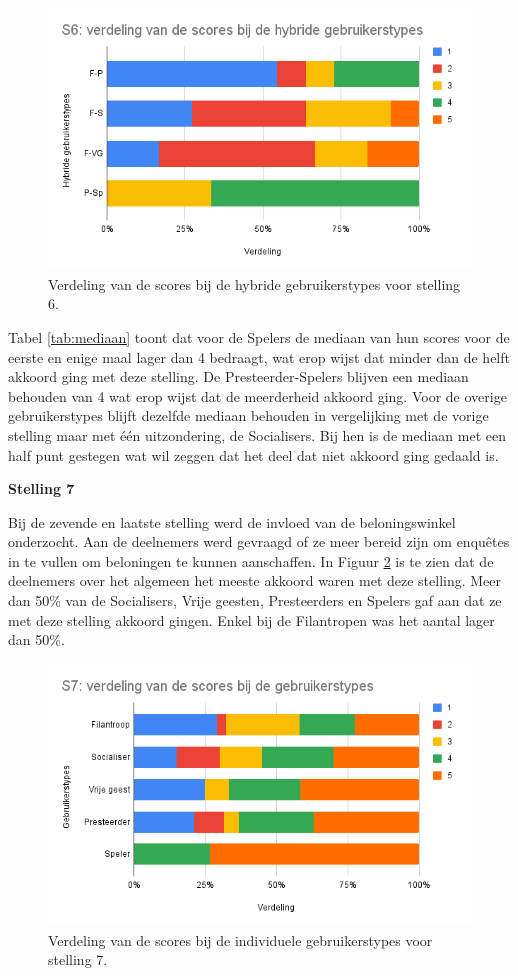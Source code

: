 \begin{figure}
    \includegraphics[width=\linewidth]{S6_Hybride.png}
    \caption{Verdeling van de scores bij de hybride gebruikerstypes voor stelling 6.}
    \label{fig:s6_hybride}
\end{figure}

Tabel \ref{tab:mediaan} toont dat voor de Spelers de mediaan van hun scores voor de eerste en enige maal lager dan 4 bedraagt, wat erop wijst dat minder dan de helft akkoord ging met deze stelling. De Presteerder-Spelers blijven een mediaan behouden van 4 wat erop wijst dat de meerderheid akkoord ging. Voor de overige gebruikerstypes blijft dezelfde mediaan behouden in vergelijking met de vorige stelling maar met één uitzondering, de Socialisers. Bij hen is de mediaan met een half punt gestegen wat wil zeggen dat het deel dat niet akkoord ging gedaald is.

\textbf{Stelling 7}

Bij de zevende en laatste stelling werd de invloed van de beloningswinkel onderzocht. Aan de deelnemers werd gevraagd of ze meer bereid zijn om enquêtes in te vullen om beloningen te kunnen aanschaffen. In Figuur \ref{fig:s7} is te zien dat de deelnemers over het algemeen het meeste akkoord waren met deze stelling. Meer dan 50\% van de Socialisers, Vrije geesten, Presteerders en Spelers gaf aan dat ze met deze stelling akkoord gingen. Enkel bij de Filantropen was het aantal lager dan 50\%.

\begin{figure}
    \includegraphics[width=\linewidth]{S7.png}
    \caption{Verdeling van de scores bij de individuele gebruikerstypes voor stelling 7.}
    \label{fig:s7}
\end{figure}

